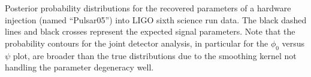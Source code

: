 \label{fig:hwinj03}
Posterior probability distributions for the recovered parameters of a hardware injection (named ``Pulsar05'')
into LIGO sixth science run data. The black dashed lines and black crosses represent the expected signal
parameters. Note that the probability contours for the joint detector analysis, in particular for the $\phi_0$
versus $\psi$ plot, are broader than the true distributions due to the smoothing kernel not handling the
parameter degeneracy well.
